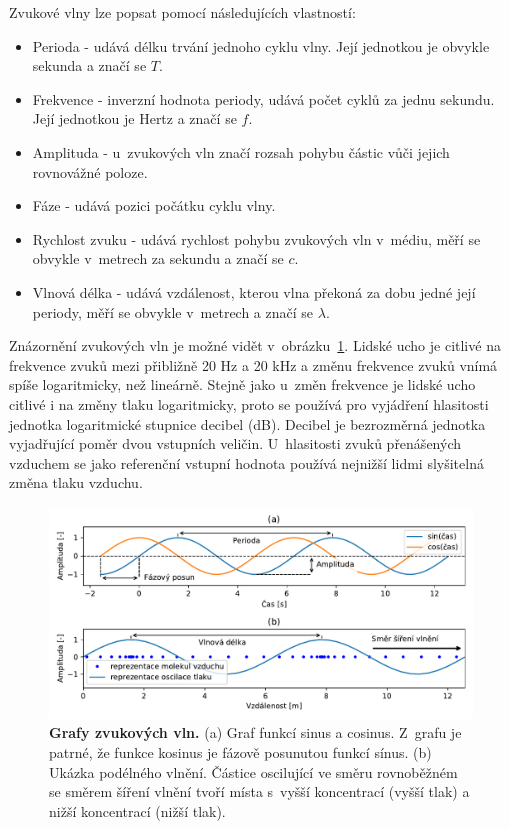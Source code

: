 Zvukové vlny lze popsat pomocí následujících vlastností:

\begin{itemize}
    \item Perioda - udává délku trvání jednoho cyklu vlny. Její jednotkou je obvykle sekunda a značí se $T$.
    \item Frekvence - inverzní hodnota periody, udává počet cyklů za jednu sekundu. Její jednotkou je Hertz a značí se $f$.
    \item Amplituda - u~zvukových vln značí rozsah pohybu částic vůči jejich rovnovážné poloze.
    \item Fáze - udává pozici počátku cyklu vlny.
    \item Rychlost zvuku - udává rychlost pohybu zvukových vln v~médiu, měří se obvykle v~metrech za sekundu a značí se $c$.
    \item Vlnová délka - udává vzdálenost, kterou vlna překoná za dobu jedné její periody, měří se obvykle v~metrech a značí se $\lambda$.
\end{itemize}

Znázornění zvukových vln je možné vidět v~obrázku~\ref{obr_sinusoidy}. Lidské ucho je citlivé na frekvence zvuků mezi přibližně 20 Hz a 20 kHz a změnu frekvence zvuků vnímá spíše logaritmicky, než lineárně. Stejně jako u~změn frekvence je lidské ucho citlivé i na změny tlaku logaritmicky, proto se používá pro vyjádření hlasitosti jednotka logaritmické stupnice decibel (dB). Decibel je bezrozměrná jednotka vyjadřující poměr dvou vstupních veličin. U~hlasitosti zvuků přenášených vzduchem se jako referenční vstupní hodnota používá nejnižší lidmi slyšitelná změna tlaku vzduchu.\cite{music_theory}\cite{db}

\begin{figure}[h]
    \centering
    \includegraphics[width=\textwidth]{obrazky/sinusoidy.pdf}
    \caption{\textbf{Grafy zvukových vln.} (a) Graf funkcí sinus a cosinus. Z~grafu je patrné, že funkce kosinus je fázově posunutou funkcí sínus. (b) Ukázka podélného vlnění. Částice oscilující ve směru rovnoběžném se směrem šíření vlnění tvoří místa s~vyšší koncentrací (vyšší tlak) a nižší koncentrací (nižší tlak).}
    \label{obr_sinusoidy}
\end{figure}

